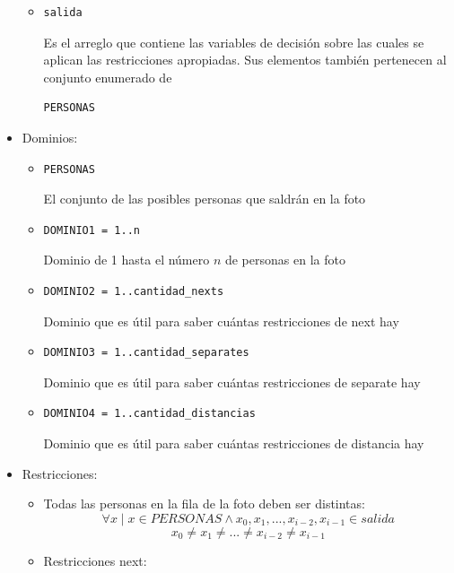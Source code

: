 \documentclass[12pt]{article}
\begin{document}
\begin{itemize}
\begin{itemize}
\item \begin{verbatim}
salida
\end{verbatim}
Es el arreglo que contiene las variables de decisión sobre las cuales se aplican las restricciones apropiadas. Sus elementos también pertenecen al conjunto enumerado de
\begin{verbatim}
PERSONAS
\end{verbatim}
\end{itemize}
\item Dominios:
\begin{itemize}
\item \begin{verbatim}
PERSONAS
\end{verbatim}
El conjunto de las posibles personas que saldrán en la foto
\item \begin{verbatim}
DOMINIO1 = 1..n
\end{verbatim}
Dominio de 1 hasta el número $n$ de personas en la foto
\item \begin{verbatim}
DOMINIO2 = 1..cantidad_nexts
\end{verbatim}
Dominio que es útil para saber cuántas restricciones de next hay
\item \begin{verbatim}
DOMINIO3 = 1..cantidad_separates
\end{verbatim}
Dominio que es útil para saber cuántas restricciones de separate hay
\item \begin{verbatim}
DOMINIO4 = 1..cantidad_distancias
\end{verbatim}
Dominio que es útil para saber cuántas restricciones de distancia hay
\end{itemize}
\item Restricciones:
\begin{itemize}
\item Todas las personas en la fila de la foto deben ser distintas:
\begin{equation*}
\forall x \mid x \in PERSONAS \land x_{0}, x_{1}, ..., x_{i-2}, x_{i-1} \in salida
\end{equation*}
\begin{equation*}
x_{0} \neq x_{1} \neq ... \neq x_{i-2} \neq x_{i-1}
\end{equation*}
\item Restricciones next:
\begin{equation*}

\end{equation*}
\end{itemize}
\end{itemize}
\end{document}
